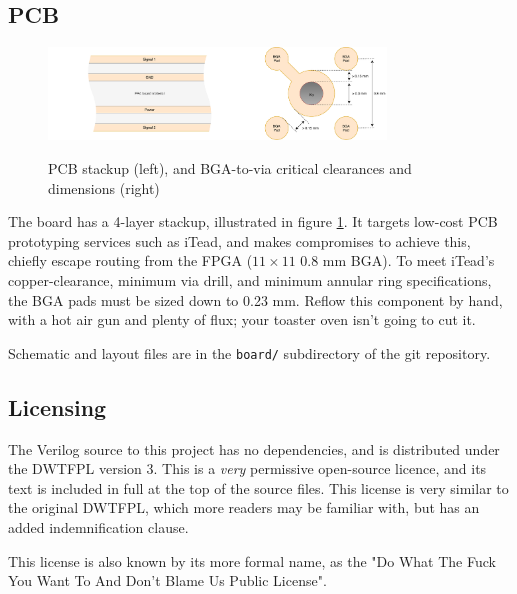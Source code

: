 \subsection{PCB}


\begin{figure}[!htb]
\centering
\caption{PCB stackup (left), and BGA-to-via critical clearances and dimensions (right)}
\includegraphics[width=0.8\textwidth]{diagrams/stackup_and_bga.pdf}
\label{diagram:stackup_and_bga}
\end{figure}

The board has a 4-layer stackup, illustrated in figure \ref{diagram:stackup_and_bga}. It targets low-cost PCB prototyping services such as iTead, and makes compromises to achieve this, chiefly escape routing from the FPGA ($11 \times 11$ 0.8 mm BGA). To meet iTead's copper-clearance, minimum via drill, and minimum annular ring specifications, the BGA pads must be sized down to 0.23 mm. Reflow this component by hand, with a hot air gun and plenty of flux; your toaster oven isn't going to cut it.

Schematic and layout files are in the {\tt board/} subdirectory of the git repository.

\subsection{Licensing}

The Verilog source to this project has no dependencies, and is distributed under the DWTFPL version 3. This is a {\it very} permissive open-source licence, and its text is included in full at the top of the source files. This license is very similar to the original DWTFPL, which more readers may be familiar with, but has an added indemnification clause.

This license is also known by its more formal name, as the "Do What The Fuck You Want To And Don't Blame Us Public License".